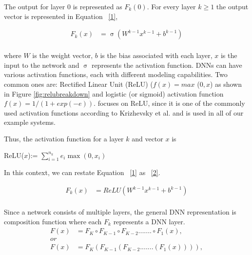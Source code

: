 The output for layer 0 is represented as $F_k(0)$.
For every layer $k \geq 1$ the output vector is represented in Equation ~\ref{1}, 

\begin{equation}
\label{1}
\begin{aligned}
F_k(x) &= \upsigma(W^{k-1}x^{k-1} + b^{k-1}) \\
\end{aligned}
\end{equation}

where $W$ is the weight vector, $b$ is the bias associated with each layer, $x$ is the input to the network and $\upsigma$ represents the activation function. 
\ac{DNN}s can have various activation functions, each with different modeling capabilities. 
Two common ones are: Rectified Linear Unit (ReLU) ($f(x) = max$ (${0,x}$) as shown in Figure \ref{fig:relubreakdown} and logistic (or sigmoid) activation function $f(x)=1/(1+ exp(-e))$.
\tool focuses on ReLU,  since it is one of the commonly used activation functions according to Krizhevsky et al. \cite{10.1145/3065386} and is used in all of our example systems.

Thus, the activation function for a layer $k$ and vector $x$ is 

ReLU($x$):= $\sum_{i=1}^{n_k} e_{i}\max(0, x_{i})$ 


In this context, we can restate Equation ~\ref{1} as ~\ref{2}. 

\begin{equation}
\label{2}
\begin{aligned}
F_k(x) &= ReLU(W^{k-1}x^{k-1} + b^{k-1}) \\
\end{aligned}
\end{equation}

Since a network consists of multiple layers, the general \ac{DNN} representation is composition function where each $F_k$ represents a \ac{DNN} layer. 
\begin{equation}
\label{3}
	\begin{aligned}
	F(x) &= F_K \circ F_{K-1} \circ F_{K-2} ....... \circ F_1(x),    \\
	or \\
	F(x) &= F_K ( F_{K-1}( F_{K-2} .......  (F_1(x)))),    \\
	\end{aligned}
\end{equation}


